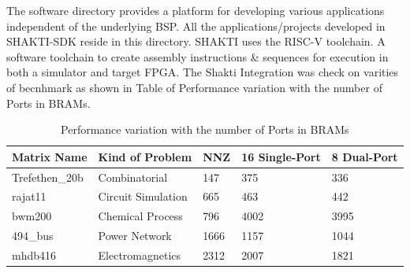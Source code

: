 The software directory provides a platform for developing various applications independent of the underlying BSP. All the applications/projects developed in SHAKTI-SDK reside in this directory. SHAKTI uses the RISC-V toolchain. A software toolchain to create assembly instructions \& sequences for execution in both a simulator and target FPGA. The Shakti Integration was check on varities of becnhmark as shown in Table of Performance variation with the number of Ports in BRAMs.

\begin{table}[h]
	\centering
	\begin{tabular}{|lllll|}
	\hline
	\multicolumn{1}{|l|}{Matrix Name} & \multicolumn{1}{l|}{Kind of Problem} & \multicolumn{1}{l|}{NNZ} & \multicolumn{1}{l|}{16 Single-Port} & 8 Dual-Port \\ \hline
	Trefethen\_20b & Combinatorial               & 147  & 375  & 336  \\
	rajat11        & Circuit Simulation          & 665  & 463  & 442  \\
	bwm200         & Chemical Process & 796  & 4002 & 3995 \\
	494\_bus       & Power Network               & 1666 & 1157 & 1044 \\
	mhdb416        & Electromagnetics            & 2312 & 2007 & 1821 \\ \hline
	\end{tabular}
	\caption{Performance variation with the number of Ports in BRAMs}
\end{table}
